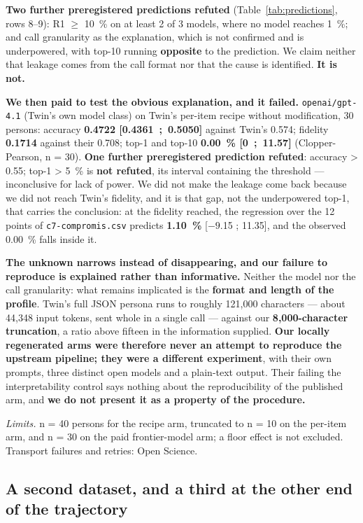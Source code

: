 \documentclass[sigconf,anonymous,review]{acmart}
\begin{document}
\textbf{Two further preregistered predictions refuted} (Table~\ref{tab:predictions}, rows 8--9): R1 $\geq$ 10~\% on at least 2 of 3 models, where no model reaches 1~\%; and call granularity as the explanation, which is not confirmed and is underpowered, with top-10 running \textbf{opposite} to the prediction. We claim neither that leakage comes from the call format nor that the cause is identified. \textbf{It is not.}

\textbf{We then paid to test the obvious explanation, and it failed.} \texttt{openai/\allowbreak{}gpt-\allowbreak{}4\allowbreak{}.1} (Twin's own model class) on Twin's per-item recipe without modification, 30 persons: accuracy \textbf{0.4722 [0.4361~;~0.5050]} against Twin's 0.574; fidelity \textbf{0.1714} against their 0.708; top-1 and top-10 \textbf{0.00~\% [0~;~11.57]} (Clopper-Pearson, n = 30). \textbf{One further preregistered prediction refuted}: accuracy > 0.55; top-1 > 5~\% is \textbf{not refuted}, its interval containing the threshold --- inconclusive for lack of power. We did not make the leakage come back because we did not reach Twin's fidelity, and it is that gap, not the underpowered top-1, that carries the conclusion: at the fidelity reached, the regression over the 12 points of \texttt{c7-\allowbreak{}compromis\allowbreak{}.csv} predicts \textbf{1.10~\%} [$-9$.15 ; 11.35], and the observed 0.00~\% falls inside it.

\textbf{The unknown narrows instead of disappearing, and our failure to reproduce is explained rather than informative.} Neither the model nor the call granularity: what remains implicated is the \textbf{format and length of the profile}. Twin's full JSON persona runs to roughly 121,000 characters --- about 44,348 input tokens, sent whole in a single call --- against our \textbf{8,000-character truncation}, a ratio above fifteen in the information supplied. \textbf{Our locally regenerated arms were therefore never an attempt to reproduce the upstream pipeline; they were a different experiment}, with their own prompts, three distinct open models and a plain-text output. Their failing the interpretability control says nothing about the reproducibility of the published arm, and \textbf{we do not present it as a property of the procedure.}

\textit{Limits.} n = 40 persons for the recipe arm, truncated to n = 10 on the per-item arm, and n = 30 on the paid frontier-model arm; a floor effect is not excluded. Transport failures and retries: Open Science.

\subsection{A second dataset, and a third at the other end of the trajectory}
\end{document}
